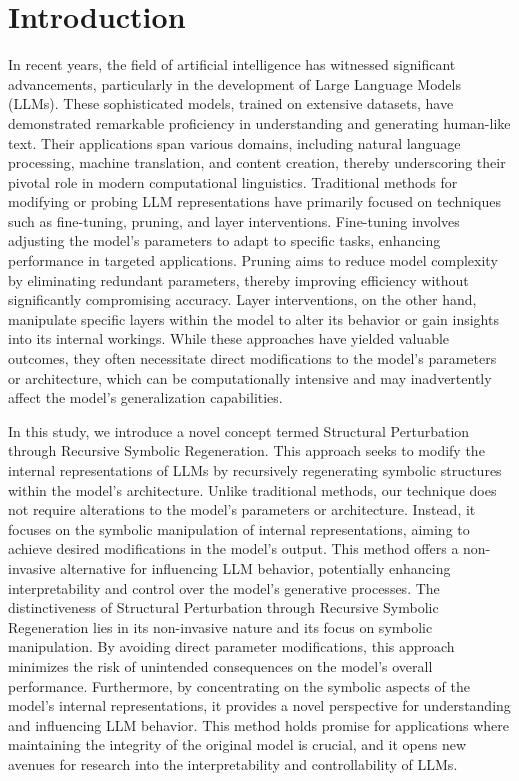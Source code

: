 \documentclass[5p,times]{elsarticle}
\begin{document}
\section{Introduction}

In recent years, the field of artificial intelligence has witnessed significant advancements, particularly in the development of Large Language Models (LLMs). These sophisticated models, trained on extensive datasets, have demonstrated remarkable proficiency in understanding and generating human-like text. Their applications span various domains, including natural language processing, machine translation, and content creation, thereby underscoring their pivotal role in modern computational linguistics. Traditional methods for modifying or probing LLM representations have primarily focused on techniques such as fine-tuning, pruning, and layer interventions. Fine-tuning involves adjusting the model's parameters to adapt to specific tasks, enhancing performance in targeted applications. Pruning aims to reduce model complexity by eliminating redundant parameters, thereby improving efficiency without significantly compromising accuracy. Layer interventions, on the other hand, manipulate specific layers within the model to alter its behavior or gain insights into its internal workings. While these approaches have yielded valuable outcomes, they often necessitate direct modifications to the model's parameters or architecture, which can be computationally intensive and may inadvertently affect the model's generalization capabilities.

In this study, we introduce a novel concept termed Structural Perturbation through Recursive Symbolic Regeneration. This approach seeks to modify the internal representations of LLMs by recursively regenerating symbolic structures within the model's architecture. Unlike traditional methods, our technique does not require alterations to the model's parameters or architecture. Instead, it focuses on the symbolic manipulation of internal representations, aiming to achieve desired modifications in the model's output. This method offers a non-invasive alternative for influencing LLM behavior, potentially enhancing interpretability and control over the model's generative processes. The distinctiveness of Structural Perturbation through Recursive Symbolic Regeneration lies in its non-invasive nature and its focus on symbolic manipulation. By avoiding direct parameter modifications, this approach minimizes the risk of unintended consequences on the model's overall performance. Furthermore, by concentrating on the symbolic aspects of the model's internal representations, it provides a novel perspective for understanding and influencing LLM behavior. This method holds promise for applications where maintaining the integrity of the original model is crucial, and it opens new avenues for research into the interpretability and controllability of LLMs.
\end{document}
